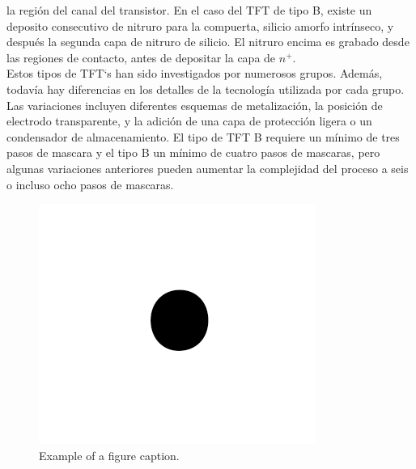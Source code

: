 \documentclass[conference]{IEEEtran}
\begin{document}
    la región del canal del transistor. En el caso del TFT de tipo B, existe un deposito
    consecutivo de nitruro para la compuerta, silicio amorfo intrínseco, y después
    la segunda capa de nitruro de silicio. El nitruro encima es grabado desde las
    regiones de contacto, antes de depositar la capa de $n^+$.
    \\
    Estos tipos de TFT`s han sido investigados por numerosos grupos. Además, todavía 
    hay diferencias en los detalles de la tecnología utilizada por cada grupo.
    Las variaciones incluyen diferentes esquemas de metalización, la posición de
    electrodo transparente, y la adición de una capa de protección ligera o un condensador
    de almacenamiento. El tipo de TFT B requiere un mínimo de tres
    pasos de mascara y el tipo B un mínimo de cuatro pasos de mascaras, pero
    algunas variaciones anteriores pueden aumentar la complejidad del proceso a
    seis o incluso ocho pasos de mascaras.


\begin{figure}[htbp]
\centerline{\includegraphics{fig1.png}}
\caption{Example of a figure caption.}
\label{fig}
\end{figure}
\end{document}
